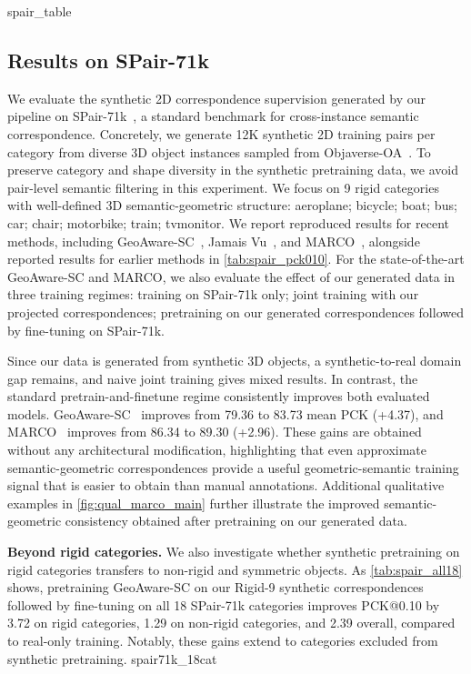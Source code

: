 {spair_table}

\subsection{Results on SPair-71k}
\label{spair71k_eval}
We evaluate the synthetic 2D correspondence supervision generated by our pipeline on SPair-71k~\cite{min2019spair71k}, a standard benchmark for cross-instance semantic correspondence.
Concretely, we generate 12K synthetic 2D training pairs per category from diverse 3D object instances sampled from Objaverse-OA~\cite{lu2025orientationmatters}. To preserve category and shape diversity in the synthetic pretraining data, we avoid pair-level semantic filtering in this experiment. We focus on 9 rigid categories with well-defined 3D semantic-geometric structure: aeroplane; bicycle; boat; bus; car; chair; motorbike; train; tvmonitor. We report reproduced results for recent methods, including GeoAware-SC~\cite{zhang2024tellingLeftFromRight}, Jamais Vu~\cite{mariotti2025jamaisvu}, and MARCO~\cite{cuttano2026marco}, alongside reported results for earlier methods in \autoref{tab:spair_pck010}.
%
For the state-of-the-art GeoAware-SC and MARCO, we also evaluate the effect of our generated data in three training regimes: training on SPair-71k only; joint training with our projected correspondences; pretraining on our generated correspondences followed by fine-tuning on SPair-71k. 

Since our data is generated from synthetic 3D objects, a synthetic-to-real domain gap remains,
and naive joint training gives mixed results. In contrast, the standard pretrain-and-finetune
regime consistently improves both evaluated models. GeoAware-SC~\cite{zhang2024tellingLeftFromRight}
improves from 79.36 to 83.73 mean PCK (+4.37), and MARCO~\cite{cuttano2026marco}
improves from 86.34 to 89.30 (+2.96). These gains are obtained without any architectural
modification, highlighting that even approximate semantic-geometric correspondences provide
a useful geometric-semantic training signal that is easier to obtain than manual annotations.
Additional qualitative examples in \autoref{fig:qual_marco_main} further illustrate the
improved semantic-geometric consistency obtained after pretraining on our generated data.

\noindent\textbf{Beyond rigid categories.}
We also investigate whether synthetic pretraining on rigid
categories transfers to non-rigid and symmetric objects.
As \autoref{tab:spair_all18} shows, pretraining GeoAware-SC
on our Rigid-9 synthetic correspondences followed by
fine-tuning on all 18 SPair-71k categories improves
PCK@0.10 by 3.72 on rigid categories, 1.29 on non-rigid
categories, and 2.39 overall, compared to real-only training.
Notably, these gains extend to categories excluded
from synthetic pretraining.
{spair71k_18cat}

